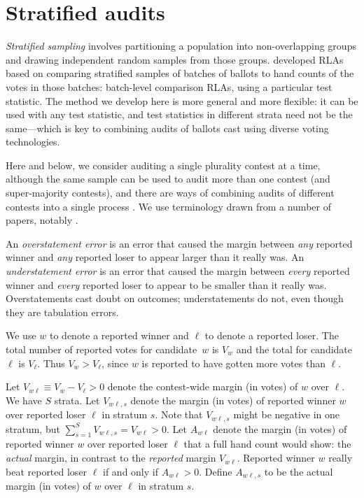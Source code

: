 \documentclass[runningheads]{llncs}
\begin{document}
\section{Stratified audits} \label{sec:stratified}

\emph{Stratified sampling} involves partitioning a population
into non-overlapping groups and drawing independent random samples from those groups.
\cite{stark08a,higginsEtal11} developed RLAs based on comparing stratified samples of batches of ballots to hand counts of the votes in those batches: batch-level comparison RLAs, using a particular test statistic.
The method we develop here is more general and more flexible: it can be used with any test statistic, and test statistics in different strata need not be the same---which is key to combining audits of ballots cast using diverse voting technologies.

Here and below, we consider auditing a single plurality contest at a time, although the same sample can be used to audit more than one contest (and super-majority contests), and there are ways of combining audits of different contests into a single process \cite{stark09c,stark10d}.
We use terminology drawn from a number of papers, notably \cite{lindemanStark12}.

An \emph{overstatement error} is an error that caused the margin between \emph{any} reported
winner and \emph{any} reported loser to appear larger than it really was.
An \emph{understatement error} is an error that caused the margin between \emph{every} reported
winner and \emph{every} reported loser to appear to be smaller than it really was.
Overstatements cast doubt on outcomes; understatements do not, even though they are tabulation errors.

We use $w$ to denote a reported winner and $\ell$ to denote a reported loser.
The total number of reported votes for candidate~$w$ is $V_{w}$ 
and the total for candidate~$\ell$ is $V_{\ell}$.
Thus $V_{w} > V_{\ell}$, since $w$ is reported to have gotten more votes than $\ell$.

Let $V_{w\ell} \equiv V_{w} - V_{\ell} > 0$ denote the contest-wide margin (in votes) of 
$w$ over  $\ell$.
We have $S$ strata.
Let $V_{w\ell,s}$ denote the margin (in votes) of reported winner $w$ over reported loser $\ell$
in stratum $s$. 
Note that $V_{w\ell,s}$ might be negative in one stratum, but $\sum_{s=1}^S V_{w\ell,s} = V_{w\ell} > 0$.
Let $A_{w\ell}$ denote the margin (in votes) of reported winner $w$ over reported loser $\ell$ that  a full hand count would show: the \emph{actual} margin, in contrast to the \emph{reported} margin $V_{w\ell}$.
Reported winner $w$ really beat reported loser $\ell$ if and only if $A_{w\ell} > 0$.
Define $A_{w\ell,s}$ to be the actual margin (in votes) of $w$ over $\ell$ in stratum $s$.
\end{document}
